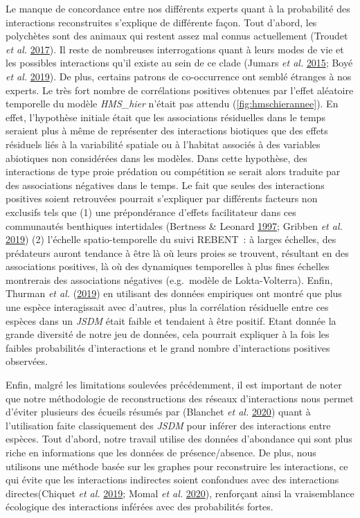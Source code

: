 \documentclass[12pt,]{article}
\begin{document}
Le manque de concordance entre nos différents experts quant à la
probabilité des interactions reconstruites s'explique de différente
façon. Tout d'abord, les polychètes sont des animaux qui restent assez
mal connus actuellement (Troudet \emph{et al.}
\protect\hyperlink{ref-Troudet_2017}{2017}). Il reste de nombreuses
interrogations quant à leurs modes de vie et les possibles interactions
qu'il existe au sein de ce clade (Jumars \emph{et al.}
\protect\hyperlink{ref-Jumars_2015}{2015}; Boyé \emph{et al.}
\protect\hyperlink{ref-Boye_2019a}{2019}). De plus, certains patrons de
co-occurrence ont semblé étranges à nos experts. Le très fort nombre de
corrélations positives obtenues par l'effet aléatoire temporelle du
modèle \emph{HMS\_hier} n'était pas attendu (\cref{fig:hmschierannee}).
En effet, l'hypothèse initiale était que les associations résiduelles
dans le temps seraient plus à même de représenter des interactions
biotiques que des effets résiduels liés à la variabilité spatiale ou à
l'habitat associés à des variables abiotiques non considérées dans les
modèles. Dans cette hypothèse, des interactions de type proie prédation
ou compétition se serait alors traduite par des associations négatives
dans le temps. Le fait que seules des interactions positives soient
retrouvées pourrait s'expliquer par différents facteurs non exclusifs
tels que (1) une prépondérance d'effets facilitateur dans ces
communautés benthiques intertidales (Bertness \& Leonard
\protect\hyperlink{ref-Bertness_1997}{1997}; Gribben \emph{et al.}
\protect\hyperlink{ref-Gribben_2019}{2019}) (2) l'échelle
spatio-temporelle du suivi REBENT~: à larges échelles, des prédateurs
auront tendance à être là où leurs proies se trouvent, résultant en des
associations positives, là où des dynamiques temporelles à plus fines
échelles montrerais des associations négatives (e.g.~modèle de
Lokta-Volterra). Enfin, Thurman \emph{et al.}
(\protect\hyperlink{ref-Thurman_2019}{2019}) en utilisant des données
empiriques ont montré que plus une espèce interagissait avec d'autres,
plus la corrélation résiduelle entre ces espèces dans un \emph{JSDM}
était faible et tendaient à être positif. Etant donnée la grande
diversité de notre jeu de données, cela pourrait expliquer à la fois les
faibles probabilités d'interactions et le grand nombre d'interactions
positives observées.

Enfin, malgré les limitations soulevées précédemment, il est important
de noter que notre méthodologie de reconstructions des réseaux
d'interactions nous permet d'éviter plusieurs des écueils résumés par
(Blanchet \emph{et al.} \protect\hyperlink{ref-Blanchet_2020}{2020})
quant à l'utilisation faite classiquement des \emph{JSDM} pour inférer
des interactions entre espèces. Tout d'abord, notre travail utilise des
données d'abondance qui sont plus riche en informations que les données
de présence/absence. De plus, nous utilisons une méthode basée sur les
graphes pour reconstruire les interactions, ce qui évite que les
interactions indirectes soient confondues avec des interactions
directes(Chiquet \emph{et al.}
\protect\hyperlink{ref-Chiquet_2019}{2019}; Momal \emph{et al.}
\protect\hyperlink{ref-Momal_2020}{2020}), renforçant ainsi la
vraisemblance écologique des interactions inférées avec des probabilités
fortes.
\end{document}
